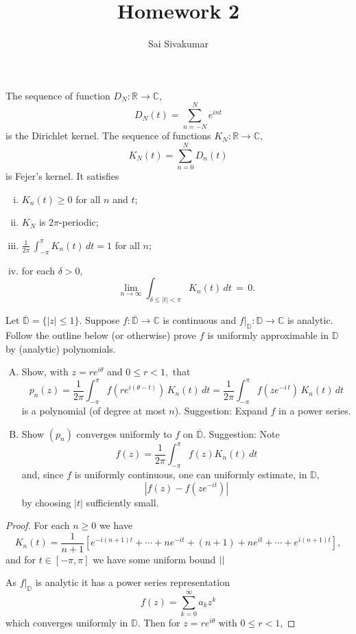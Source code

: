 \documentclass[12pt]{amsart}
\title{Homework 2}
\author{Sai Sivakumar}
\newcommand{\RR}{\mathbb{R}}
\newcommand{\CC}{\mathbb{C}}
\newcommand{\DD}{\mathbb{D}}
\begin{document}
\maketitle

\thispagestyle{empty}
The sequence of function $D_N:\RR\to \CC,$  
\[
 D_N(t) = \sum_{n=-N}^N e^{int}
\]
 is the Dirichlet kernel. The sequence of functions $K_N:\RR\to \CC,$ 
\[
 K_N(t) =   \sum_{n=0}^N D_n(t) 
\]
 is Fejer's kernel. It satisfies
\begin{enumerate}[(i)]
 \item $K_n(t)\ge 0$ for all $n$ and $t;$
 \item $K_N$ is $2\pi$-periodic;
 \item  $\frac{1}{2\pi}\, \int_{-\pi}^{\pi} K_n(t)\, dt = 1$ for all $n;$ 
 \item  for each $\delta>0,$
\[
  \lim_{n\to\infty} \int_{\delta \le |t|<\pi} K_n(t)\, dt \, = \, 0.
\]
\end{enumerate}
\bigskip

Let $\overline{\DD}=\{|z| \le 1\}.$ Suppose $f:\overline{\DD}\to \CC$ is continuous and $f|_{\DD}:\DD\to\CC$ is analytic. Follow the outline below
(or otherwise) prove $f$ is uniformly approximable in $\DD$  by (analytic)  polynomials.

\begin{enumerate}[(A)]\itemsep=10pt
 \item  Show, with 
 $z=re^{i\theta}$ and $0\le r<1,$ that
\[
 p_n(z) =\frac{1}{2\pi} \int_{-\pi}^\pi f(re^{i(\theta -t)})\, K_n(t)\, dt
  = \frac{1}{2\pi} \int_{-\pi}^\pi f(ze^{-i\, t})\, K_n(t)\, dt
\]
 is a polynomial  (of degree at most $n$). Suggestion: Expand $f$ in a power series.
\item Show $(p_n)$ converges uniformly to $f$ on $\overline{\DD}.$ Suggestion: Note
\[
 f(z) =\frac{1}{2\pi}\int_{-\pi}^\pi f(z) K_n(t)\, dt 
\]
and, since $f$ is uniformly continuous, one can uniformly estimate, in  $\DD,$ 
\[
    |f(z)-f(ze^{-it})|
\]
 by choosing $|t|$ sufficiently small.  
\end{enumerate}

 \bigskip

\begin{proof}
\baselineskip=24pt
For each $n\geq 0$ we have \[K_n(t) = \frac{1}{n+1}\left[e^{-i(n+1)t}+ \cdots+ ne^{-it} + (n+1) + ne^{it} +\cdots + e^{i(n+1)t}\right],\] and for $t\in[-\pi,\pi]$ we have some uniform bound $\abs{}$

As $f|_\DD$ is analytic it has a power series representation \[f(z) = \sum_{k=0}^\infty a_kz^k\] which converges uniformly in $\DD$. Then for $z = re^{i\theta}$ with $0\leq r < 1$, 
\end{proof}
\end{document}
